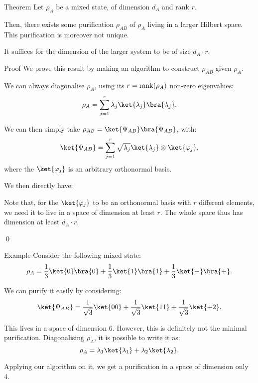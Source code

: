 \documentclass[a4paper]{article}
\begin{document}
\begin{parag}{Theorem}
    Let $\rho_A$ be a mixed state, of dimension $d_A$ and rank $r$.

    Then, there exists some purification $\rho_{AB}$ of $\rho_A$ living in a larger Hilbert space. This purification is moreover not unique.  

    It suffices for the dimension of the larger system to be of size $d_A\cdot r$.

    \begin{subparag}{Proof}
        We prove this result by making an algorithm to construct $\rho_{AB}$ given $\rho_A$.

        We can always diagonalise $\rho_A$, using its $r = \rank\left(\rho_A\right)$ non-zero eigenvalues: 
        \[\rho_A = \sum_{j=1}^{r} \lambda_j \ket{\lambda_j} \bra{\lambda_j}.\]

        We can then simply take $\rho_{AB} = \ket{\Psi_{AB}}\bra{\Psi_{AB}}$, with:
        \[\ket{\Psi_{AB}} = \sum_{j=1}^{r} \sqrt{\lambda_j} \ket{\lambda_j} \otimes \ket{\phi_j},\]
        where the $\ket{\phi_j}$ is an arbitrary orthonormal basis.

        We then directly have: 

        Note that, for the $\ket{\phi_j}$ to be an orthonormal basis with $r$ different elements, we need it to live in a space of dimension at least $r$. The whole space thus has dimension at least $d_A\cdot r$.

        \qed
    \end{subparag}
\end{parag}

\begin{parag}{Example}
    Consider the following mixed state: 
    \[\rho_A = \frac{1}{3}\ket{0}\bra{0} + \frac{1}{3} \ket{1}\bra{1} + \frac{1}{3} \ket{+}\bra{+}.\]

    We can purify it easily by considering: 
    \[\ket{\Psi_{AB}} = \frac{1}{\sqrt{3}} \ket{00} + \frac{1}{\sqrt{3}} \ket{11} + \frac{1}{\sqrt{3}} \ket{+2}.\]

    This lives in a space of dimension $6$. However, this is definitely not the minimal purification. Diagonalising $\rho_A$, it is possible to write it as: 
    \[\rho_A = \lambda_1 \ket{\lambda_1} + \lambda_2 \ket{\lambda_2}.\]

    Applying our algorithm on it, we get a purification in a space of dimension only 4.
\end{parag}
\end{document}
